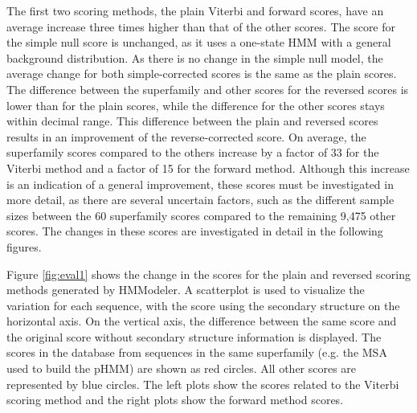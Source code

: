 The first two scoring methods, the plain Viterbi and forward scores, have an average increase three times higher than that of the other scores. The score for the simple null score is unchanged, as it uses a one-state \ac{HMM} with a general background distribution. As there is no change in the simple null model, the average change for both \mbox{simple-corrected} scores is the same as the plain scores. The difference between the superfamily and other scores for the reversed scores is lower than for the plain scores, while the difference for the other scores stays within decimal range. This difference between the plain and reversed scores results in an improvement of the reverse-corrected score. On average, the superfamily scores compared to the others increase by a factor of 33 for the Viterbi method and a factor of 15 for the forward method. Although this increase is an indication of a general improvement, these scores must be investigated in more detail, as there are several uncertain factors, such as the different sample sizes between the 60 superfamily scores compared to the remaining 9,475 other scores. The changes in these scores are investigated in detail in the following figures.




Figure \ref{fig:eval1} shows the change in the scores for the plain and reversed scoring methods generated by HMModeler. A scatterplot is used to visualize the variation for each sequence, with the score using the secondary structure on the horizontal axis. On the vertical axis, the difference between the same score and the original score without secondary structure information is displayed. The scores in the database from sequences in the same superfamily (e.g. the \ac{MSA} used to build the \ac{pHMM}) are shown as red circles. All other scores are represented by blue circles.
The left plots show the scores related to the Viterbi scoring method and the right plots show the forward method scores. 

